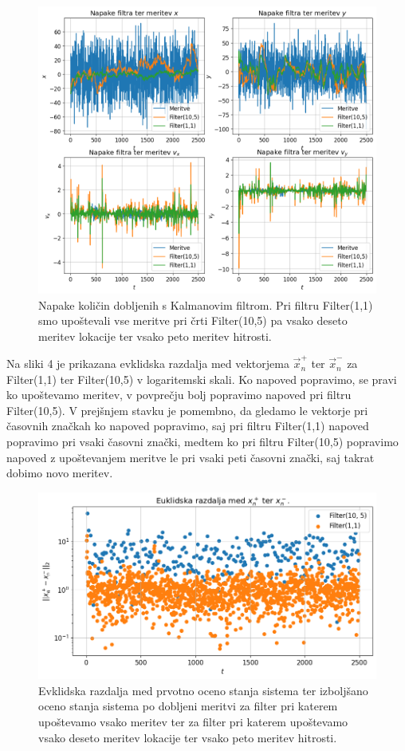 \documentclass[slovene,11pt,a4paper]{article}
\begin{document}
\begin{figure}[h!]
\centering
\includegraphics[width=14cm]{slika3.png}
\caption{Napake količin dobljenih s Kalmanovim filtrom. Pri filtru Filter(1,1) smo upoštevali vse meritve pri črti Filter(10,5) pa vsako deseto meritev lokacije ter vsako peto meritev hitrosti.}
\end{figure}

Na sliki 4 je prikazana evklidska razdalja med vektorjema $\vec{x}_n^+$ ter $\vec{x}_n^-$ za Filter(1,1) ter Filter(10,5) v logaritemski skali. Ko napoved popravimo, se pravi ko upoštevamo meritev, v povprečju bolj popravimo napoved pri filtru Filter(10,5). V prejšnjem stavku je pomembno, da gledamo le vektorje pri časovnih značkah ko napoved popravimo, saj pri filtru Filter(1,1) napoved popravimo pri vsaki časovni znački, medtem ko pri filtru Filter(10,5) popravimo napoved z upoštevanjem meritve le pri vsaki peti časovni znački, saj takrat dobimo novo meritev.

\begin{figure}[h!]
\centering
\includegraphics[width=12cm]{slika4.png}
\caption{Evklidska razdalja med prvotno oceno stanja sistema ter izboljšano oceno stanja sistema po dobljeni meritvi za filter pri katerem upoštevamo vsako meritev ter za filter pri katerem upoštevamo vsako deseto meritev lokacije ter vsako peto meritev hitrosti.}
\end{figure}
\end{document}

